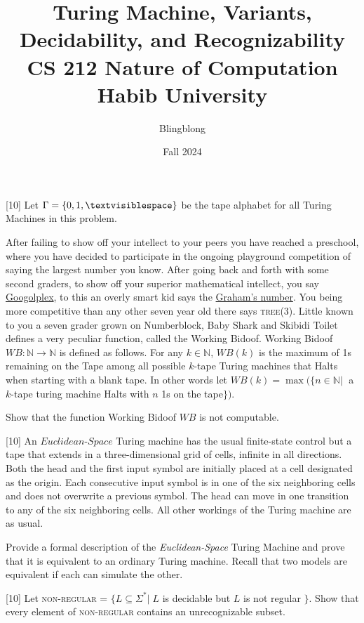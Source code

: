 \documentclass[addpoints]{exam}
\title{Turing Machine, Variants, Decidability, and Recognizability\\ \vspace{0.5cm} \Large CS 212 Nature of Computation\\Habib University}
\author{Blingblong} %
\date{Fall 2024}
\newcommand{\blank}{\textvisiblespace}
\begin{document}
\maketitle

\begin{questions}

    \titledquestion{} [10] Let $\Gamma = \{0, 1, \blank\}$ be the tape alphabet for all Turing Machines in this problem. 
    
    After failing to show off your intellect to your peers you have reached a preschool, where you have decided to participate in the ongoing playground competition of saying the largest number you know. After going back and forth with some second graders, to show off your superior mathematical intellect, you say \href{https://en.wikipedia.org/wiki/Googolplex}{Googolplex}, to this an overly smart kid says the \href{https://en.wikipedia.org/wiki/Graham%27s_number}{Graham's number}. You being more competitive than any other seven year old there says \textsc{tree}(3). Little known to you a seven grader grown on Numberblock, Baby Shark and Skibidi Toilet defines a very peculiar function, called the Working Bidoof. 
    Working Bidoof $WB : \mathbb{N} \to \mathbb{N}$ is defined as follows. For any $k \in \mathbb{N}$, $WB(k)$ is the maximum of 1s remaining on the Tape among all possible $k$-tape Turing machines that Halts when starting with a blank tape. In other words let $WB(k) = \max(\{n \in \mathbb{N}|\;$ a $k$-tape turing machine Halts with $n$ 1s on the tape$\})$. 

    Show that the function Working Bidoof $WB$ is not computable.
    
    \begin{solution}
    \end{solution}
    
    \titledquestion{} [10] An $\textit{Euclidean-Space}$ Turing machine has the usual finite-state control but a tape that extends in a three-dimensional grid of cells, infinite in all directions. Both the head and the first input symbol are initially placed at a cell designated as the origin. Each consecutive input symbol is in one of the six neighboring cells and does not overwrite a previous symbol. The head can move in one transition to any of the six neighboring cells. All other workings of the Turing machine are as usual.
    
    Provide a formal description of the \textit{Euclidean-Space} Turing Machine and prove that it is equivalent to an ordinary Turing machine. Recall that two models are equivalent if each can simulate the other.
    
    \begin{solution}
    \end{solution}
      
    \titledquestion{} [10] Let \textsc{non-regular} = $\{L \subseteq \Sigma^*|\; L$ is decidable but $L$ is not regular $\}$. 
    Show that every element of \textsc{non-regular} contains an unrecognizable subset.
    \begin{solution}
    \end{solution}
    \end{questions}
\end{document}
